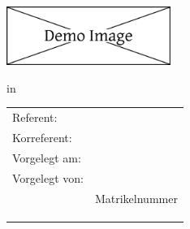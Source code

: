 \begin{titlepage}
	\begin{flushright}
		\includegraphics[width=0.4\textwidth]{images/hfu_logo.eps}
	\end{flushright}

	\begin{center}
		{
			\Large\selectfont
			\setlength\parskip{0pt}
			
			\metadataType
			
			in
			
			\metadataCourse
			
			\vspace{1cm}
			
			\LARGE\textbf{\metadataTitle}
			
			\vspace{.5cm}
			
			\Large\metadataSubtitle
			
			\vfill\vfill\vfill
		}
	
		\begin{tabular}{ll}
			
			\normalsize Referent: & \normalsize \metadataConsultant \\
			\normalsize Korreferent: & \normalsize \metadataCoconsultant \\
			\normalsize Vorgelegt am: & \normalsize \metadataSubmitDate \\
			\normalsize Vorgelegt von: & \normalsize \metadataAuthor \\
			& \normalsize Matrikelnummer \metadataMatriculationNumber \\
			& \normalsize \metadataStreetNumber \\
			& \normalsize \metadataPostalCodeTown \\
			& \normalsize \metadataEmail \\
			
		\end{tabular}
		\vfill
	\end{center}
\end{titlepage}